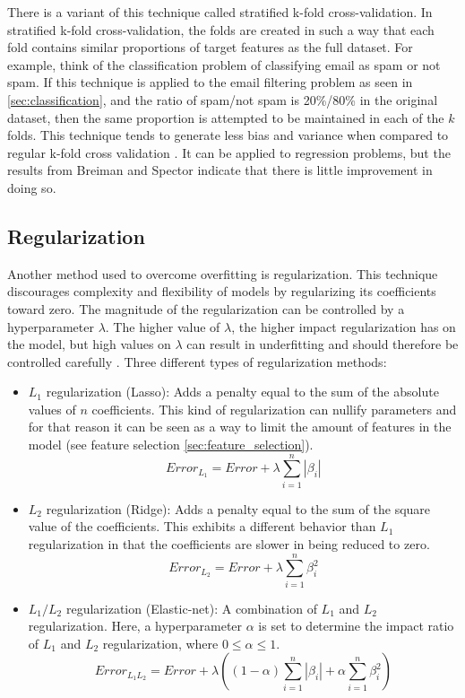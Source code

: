 	There is a variant of this technique called stratified k-fold cross-validation. In stratified k-fold cross-validation, the folds are created in such a way that each fold contains similar proportions of target features as the full dataset. For example, think of the classification problem of classifying email as spam or not spam. If this technique is applied to the email filtering problem as seen in \ref{sec:classification}, and the ratio of spam/not spam is 20\%/80\% in the original dataset, then the same proportion is attempted to be maintained in each of the $k$ folds. This technique tends to generate less bias and variance when compared to regular k-fold cross validation \cite{IP:2}. It can be applied to regression problems, but the results from Breiman and Spector \cite{ARTICLE:5} indicate that there is little improvement in doing so.

	\subsection{Regularization} \label{sec:regularization}
	Another method used to overcome overfitting is regularization. This technique discourages complexity and flexibility of models by regularizing its coefficients toward zero. The magnitude of the regularization can be controlled by a hyperparameter $\lambda$. The higher value of $\lambda$, the higher impact regularization has on the model, but high values on $\lambda$ can result in underfitting and should therefore be controlled carefully \cite{WEBSITE:13}. Three different types of regularization methods:

\begin{itemize}
	\item{$L_1$ regularization (Lasso):} Adds a penalty equal to the sum of the absolute values of $n$ coefficients. This kind of regularization can nullify parameters and for that reason it can be seen as a way to limit the amount of features in the model (see feature selection \ref{sec:feature_selection}).
		\begin{equation}
			Error_{L_1} = Error + \lambda \sum_{i=1}^{n}|\beta_i| 
		\end{equation}
	\item{$L_2$ regularization (Ridge):} Adds a penalty equal to the sum of the square value of the coefficients. This exhibits a different behavior than $L_1$ regularization in that the coefficients are slower in being reduced to zero.
		\begin{equation}
			Error_{L_2} = Error + \lambda \sum_{i=1}^{n}\beta_i^2 
		\end{equation}
	\item{$L_1/L_2$ regularization (Elastic-net):} A combination of $L_1$ and $L_2$ regularization. Here, a hyperparameter $\alpha$ is set to determine the impact ratio of $L_1$ and $L_2$ regularization, where $0 \leq \alpha \leq 1$.
 		\begin{equation}
			Error_{L_1L_2} = Error + \lambda ( (1-\alpha)\sum_{i=1}^{n}|\beta_i| + \alpha  \sum_{i=1}^{n}\beta_i^2 ) 
		\end{equation}
\end{itemize}


